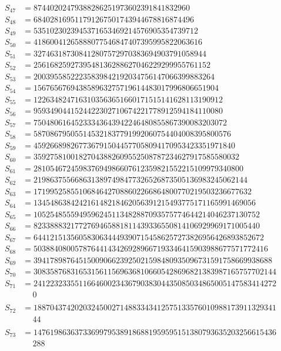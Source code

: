 \begin{align*}
S_{47} &= 87440202479388286251973602391841832960\\
S_{48} &= 684028169511791267501743944678816874496\\
S_{49} &= 5351023023945371653469214576905354739712\\
S_{50} &= 41860041265888077546847407395995822063616\\
S_{51} &= 327463187308412807572970383694903791058944\\
S_{52} &= 2561682592739548136288627046229299955761152\\
S_{53} &= 20039558522235839842192034756147066399883264\\
S_{54} &= 156765676943858963275719614483017996806651904\\
S_{55} &= 1226348247163103563651660171515141628113190912\\
S_{56} &= 9593490441524422302710674221778912594184110080\\
S_{57} &= 75048061645233343643942246480855867390083203072\\
S_{58} &= 587086795055145321837791992060754404008395800576\\
S_{59} &= 4592668982677367915044577058094170953423351971840\\
S_{60} &= 35927581001827043882609552508787234627917585580032\\
S_{61} &= 281054672459837694986607612359821552215109979340800\\
S_{62} &= 2198637556686313897498477326526873505136983245062144\\
S_{63} &= 17199525855106846427088602266864800770219503236677632\\
S_{64} &= 134548638424216148218462056391215493775171165991469056\\
S_{65} &= 1052548555949596245113482887093575774644214046237130752\\
S_{66} &= 8233888321772769465881811439336550814106929969171005440\\
S_{67} &= 64412151356058306344493907154586257273826956426893852672\\
S_{68} &= 503884080057876441434269289667193346415903988677571772416\\
S_{69} &= 3941789876451500906623925021598480935096731591758669938688\\
S_{70} &= 30835876831653156115696368106605428696821383987165757702144\\
S_{71} &= 24122323355116646002343679038304435085034865005147583414272 \\
    &\quad\ 0\\\\
S_{72} &= 18870437420203245002714883343412575133576010988173911329341 \\
    &\quad\ 44\\\\
S_{73} &= 14761986363733699795389186881959595151380793635203256615436 \\
    &\quad\ 288\\\\
\end{align*}	
